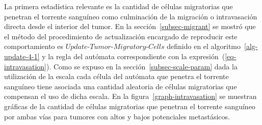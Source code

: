 La primera estad\'istica relevante es la cantidad de c\'elulas migratorias que penetran el torrente sangu\'ineo como culminaci\'on de la migraci\'on o intravasaci\'on directa desde el interior del tumor. En la secci\'on~\ref{subsec-migrant} se mostr\'o que el m\'etodo del procedimiento de actualizaci\'on encargado de reproducir este comportamiento es $Update$-$Tumor$-$Migratory$-$Cells$ definido en el algoritmo~\ref{alg-update-4-1} y la regla del aut\'omata correspondiente con la expresi\'on~(\ref{eq-intravasation}). Como se expuso en la secci\'on~\ref{subsec-scale-param} dada la utilizaci\'on de la escala cada c\'elula del aut\'omata que penetra el torrente sangu\'ineo tiene asociada una cantidad aleatoria de c\'elulas migratorias que compensan el uso de dicha escala. En la figura~\ref{graph-intravasation} se muestran gr\'aficas de la cantidad de c\'elulas migratorias que penetran el torrente sangu\'ineo por ambas v\'ias para tumores con altos y bajos potenciales metast\'asicos.
